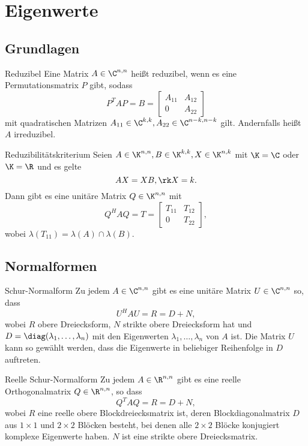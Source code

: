 \section{Eigenwerte}
\subsection{Grundlagen}

\begin{karte}{Reduzibel}
    Eine Matrix \( A \in \C^{n,n} \) heißt reduzibel, wenn es eine Permutationsmatrix \(P\)
    gibt, sodass 
    \[ P^T A P = B = \left[ \begin{matrix} A_{11} & A_{12} \\ 0 & A_{22} \end{matrix} \right] \]
    mit quadratischen Matrizen \( A_{11} \in \C^{k,k}, A_{22} \in \C^{n-k,n-k} \) gilt. 
    Andernfalls heißt \( A \) irreduzibel.
\end{karte}

\begin{karte}{Reduzibilitätskriterium}
    Seien \( A \in \K^{n,n}, B\in \K^{k,k}, X \in \K^{n,k} \) 
    mit \( \K = \C \) oder \(\K = \R \) und es gelte 
    \[ AX = XB, \rk X = k. \]
    Dann gibt es eine unitäre Matrix \(Q \in \K^{n,n}\) mit 
    \[ Q^H A Q = T = \left[ \begin{matrix}
        T_{11} & T_{12} \\ 0 & T_{22}
    \end{matrix} \right], \]
    wobei \( \lambda(T_{11}) = \lambda(A) \cap \lambda(B) \).
\end{karte}

\subsection{Normalformen}

\begin{karte}{Schur-Normalform}
    Zu jedem \(A\in \C^{n,n}\) gibt es eine unitäre Matrix \(U \in \C^{n,n}\) so, dass 
    \[ U^H A U = R = D + N, \]
    wobei \(R\) obere Dreiecksform, \(N\) strikte obere Dreiecksform hat und 
    \(D = \diag(\lambda_1, \ldots, \lambda_n)\) mit den Eigenwerten \( \lambda_1, \ldots, \lambda_n \)
    von \(A\) ist. Die Matrix \(U\) kann so gewählt werden, dass die Eigenwerte in beliebiger 
    Reihenfolge in \(D\) auftreten.
\end{karte}

\begin{karte}{Reelle Schur-Normalform}
    Zu jedem \( A\in \R^{n,n} \) gibt es eine reelle Orthogonalmatrix \(Q\in \R^{n,n}\), 
    so dass 
    \[ Q^T A Q = R = D + N,\]
    wobei \(R\) eine reelle obere Blockdreiecksmatrix ist, deren Blockdiagonalmatrix \(D\) 
    aus \(1\times 1\) und \(2\times 2\) Blöcken besteht, bei denen alle \(2\times 2\) Blöcke 
    konjugiert komplexe Eigenwerte haben. \(N\) ist eine strikte obere Dreiecksmatrix.
\end{karte}

